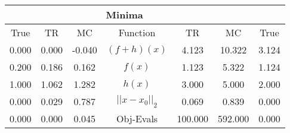 \begin{tabular}{| c |c |c || c |c |c |c |}
    \hline
    \rowcolor[gray]{0.9}
\multicolumn{3}{|c|}{Parameters} & \multicolumn{4}{|c|}{Minima}\\ \hline True & TR & MC  & Function & TR & MC & True \\
    \hline
  \rowcolor[gray]{0.7}
  0.000 & 0.000 & -0.040   & $ (f + h)(x) $ & 4.123 & 10.322 & 3.124 \\
  \rowcolor[gray]{0.8}
  0.200 & 0.186 & 0.162   & $ f(x) $ & 1.123 & 5.322 & 1.124 \\
  \rowcolor[gray]{0.7}
  1.000 & 1.062 & 1.282   & $ h(x) $ & 3.000 & 5.000 & 2.000 \\
  \rowcolor[gray]{0.8}
  0.000 & 0.029 & 0.787   & $ ||x - x_0||_2 $ & 0.069 & 0.839 & 0.000 \\
  \rowcolor[gray]{0.7}
  0.000 & 0.000 & 0.045   & Obj-Evals & 100.000 & 592.000 & 0.000 \\
\end{tabular}
